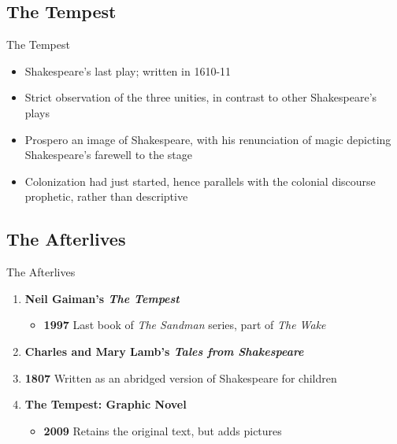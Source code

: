 \documentclass{beamer}
\begin{document}
\subsection{The Tempest}
\begin{frame}{The Tempest}
  \begin{itemize}
    \item Shakespeare's last play; written in 1610-11
    \item Strict observation of the three unities, in contrast to other Shakespeare's plays 
    \item Prospero an image of Shakespeare, with his renunciation of magic depicting Shakespeare's farewell to the stage
    \item Colonization had just started, hence parallels with the colonial discourse prophetic, rather than descriptive
  \end{itemize}
\end{frame}

\subsection{The Afterlives}
\begin{frame}{The Afterlives}
  \begin{enumerate}
  \item \textbf{Neil Gaiman's \emph{The Tempest}}
    \begin{itemize}
    \item \textbf{1997} Last book of \emph{The Sandman} series, part of \emph{The Wake}
    \end{itemize}
  \item \textbf{Charles and Mary Lamb's \emph{Tales from Shakespeare}}
    \item \textbf{1807} Written as an abridged version of Shakespeare for children
  \item \textbf{The Tempest: Graphic Novel}
    \begin{itemize}
    \item \textbf{2009} Retains the original text, but adds pictures
    \end{itemize}
  
  \end{enumerate}
\end{frame}
\end{document}
